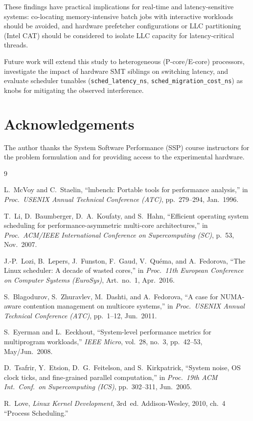 \documentclass[conference]{IEEEtran}
\begin{document}
These findings have practical implications for real-time and latency-sensitive
systems: co-locating memory-intensive batch jobs with interactive workloads
should be avoided, and hardware prefetcher configurations or LLC partitioning
(Intel CAT) should be considered to isolate LLC capacity for latency-critical
threads.

Future work will extend this study to heterogeneous (P-core/E-core) processors,
investigate the impact of hardware SMT siblings on switching latency, and
evaluate scheduler tunables (\texttt{sched\_latency\_ns},
\texttt{sched\_migration\_cost\_ns}) as knobs for mitigating the observed
interference.

\section*{Acknowledgements}
The author thanks the System Software Performance (SSP) course instructors
for the problem formulation and for providing access to the experimental
hardware.

\balance
\begin{thebibliography}{9}

L.~McVoy and C.~Staelin,
``lmbench: Portable tools for performance analysis,''
in \emph{Proc.\ USENIX Annual Technical Conference (ATC)},
pp.~279--294, Jan.~1996.

T.~Li, D.~Baumberger, D.~A.~Koufaty, and S.~Hahn,
``Efficient operating system scheduling for performance-asymmetric multi-core
architectures,''
in \emph{Proc.\ ACM/IEEE International Conference on Supercomputing (SC)},
p.~53, Nov.~2007.

J.-P.~Lozi, B.~Lepers, J.~Funston, F.~Gaud, V.~Qu{\'e}ma, and A.~Fedorova,
``The Linux scheduler: A decade of wasted cores,''
in \emph{Proc.\ 11th European Conference on Computer Systems (EuroSys)},
Art.~no.~1, Apr.~2016.

S.~Blagodurov, S.~Zhuravlev, M.~Dashti, and A.~Fedorova,
``A case for NUMA-aware contention management on multicore systems,''
in \emph{Proc.\ USENIX Annual Technical Conference (ATC)},
pp.~1--12, Jun.~2011.

S.~Eyerman and L.~Eeckhout,
``System-level performance metrics for multiprogram workloads,''
\emph{IEEE Micro}, vol.~28, no.~3, pp.~42--53, May/Jun.~2008.

D.~Tsafrir, Y.~Etsion, D.~G.~Feitelson, and S.~Kirkpatrick,
``System noise, OS clock ticks, and fine-grained parallel computation,''
in \emph{Proc.\ 19th ACM Int.\ Conf.\ on Supercomputing (ICS)},
pp.~302--311, Jun.~2005.

R.~Love,
\emph{Linux Kernel Development}, 3rd~ed.
Addison-Wesley, 2010, ch.~4 ``Process Scheduling.''

\end{thebibliography}
\end{document}
